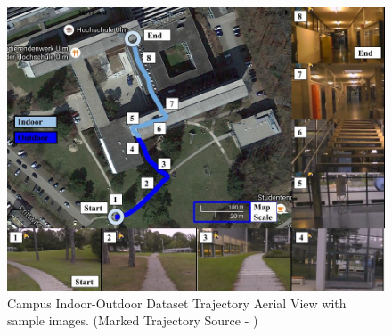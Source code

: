 \documentclass[letterpaper, 10 pt, conference]{ieeeconf}  %
\begin{document}
\begin{figure}[h]
 \includegraphics[scale=0.25]{campus-datasetTrajSampleImages}
 \caption{Campus Indoor-Outdoor Dataset Trajectory Aerial View with sample images. (Marked Trajectory Source - \cite{ctaTrajGMap})}
 \label{fig:campusTraj}
\end{figure}
\end{document}
